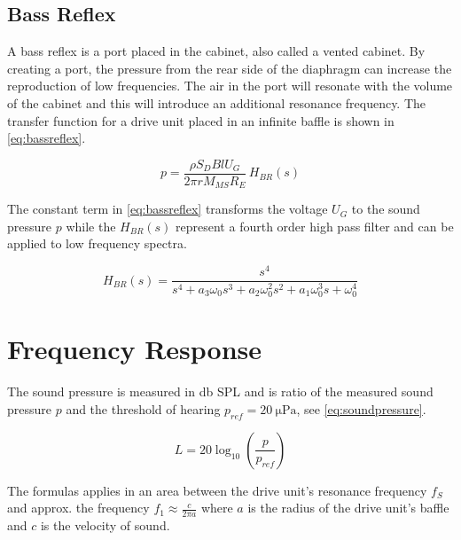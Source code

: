 \subsection{Bass Reflex}
A bass reflex is a port placed in the cabinet, also called a vented cabinet.
By creating a port, the pressure from the rear side of the diaphragm can increase the reproduction of low frequencies.
The air in the port will resonate with the volume of the cabinet and this will introduce an additional resonance frequency. \cite[p.~53]{Elektroakustik}
The transfer function for a drive unit placed in an infinite baffle is shown in \cref{eq:bassreflex}.

\begin{equation}
p = \frac{\rho S_D B l U_G}{2\pi r M_{MS} R_E}\,H_{BR}(s)
\label{eq:bassreflex}
\end{equation}

The constant term in \cref{eq:bassreflex} transforms the voltage $U_G$ to the sound pressure $p$ while the $H_{BR}(s)$ represent a fourth order high pass filter and can be applied to low frequency spectra. \cite[p.~55]{Elektroakustik}

\begin{equation}
H_{BR}(s) = \frac{s^4}{s^4+a_3\omega_0s^3+a_2\omega_0^2s^2+a_1\omega_0^3s+\omega_0^4}
\label{eq:brtf}
\end{equation}

\section{Frequency Response}
The sound pressure is measured in \si{\decibel} SPL and is ratio of the measured sound pressure $p$ and the threshold of hearing $p_{ref}=\SI{20}{\micro\pascal}$, see \cref{eq:soundpressure}.

\begin{equation}
L=20\log_{10}\left(\frac{p}{p_{ref}}\right)
\label{eq:soundpressure}
\end{equation}

The formulas applies in an area between the drive unit's resonance frequency $f_S$ and approx. the frequency $f_1\approx\frac{c}{2\pi a}$ where $a$ is the radius of the drive unit's baffle and $c$ is the velocity of sound. \cite[p.~41]{Elektroakustik}



\FloatBarrier
